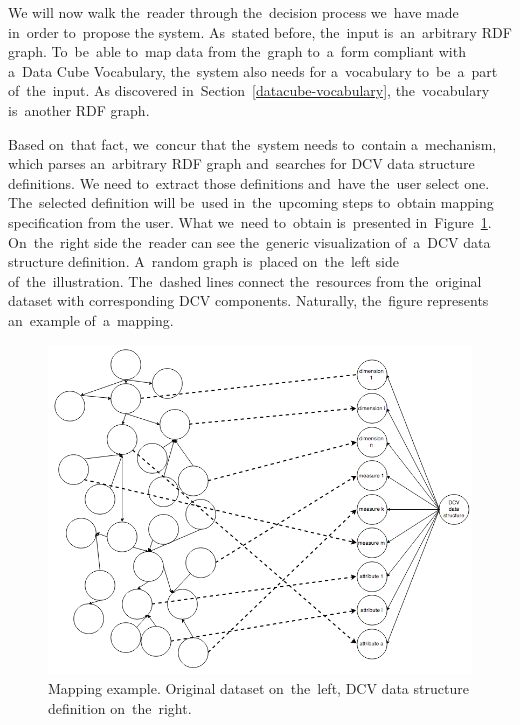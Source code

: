 We will now walk the~reader through the~decision process we~have made in~order to~propose 
the system. As~stated before, the~input is~an~arbitrary RDF graph. To~be~able to~map data from the~graph to~a~form compliant with a~Data 
Cube Vocabulary, the~system also needs for a~vocabulary to~be~a~part of~the~input. 
As discovered in~Section~\ref{datacube-vocabulary}, the~vocabulary is~another 
RDF graph.

Based on~that fact, we~concur that the~system needs to~contain a~mechanism, which 
parses an~arbitrary RDF graph and~searches for DCV data structure definitions. 
We need to~extract those definitions and~have the~user select one. The~selected 
definition will be~used in~the~upcoming steps to~obtain mapping specification from 
the user. What we~need to~obtain is~presented in~Figure~\ref{fig:mapping-example}. On~the~right side the~reader can see the~generic visualization of~a~DCV data structure definition. A~random graph is~placed on~the~left side of~the~illustration. The~dashed lines connect the~resources 
from the~original dataset with corresponding DCV components. Naturally, the~figure represents an~example of~a~mapping.

\begin{figure}
	\centering
	\includegraphics[width=140mm]{img/mapping-example.png}
	\caption{Mapping example. Original dataset on~the~left, DCV data structure definition on~the~right.}
	\label{fig:mapping-example}
\end{figure}

